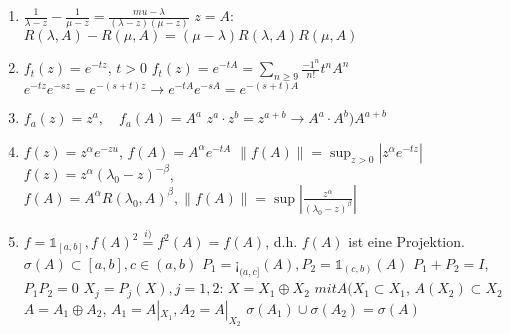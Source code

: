  \begin{beispiel}
 	\begin{enumerate}
 		\item $\frac{1}{\lambda - z} - \frac{1}{\mu - z} = \frac{mu - \lambda}{(\lambda - z)(\mu - z)}$
 			$z = A$: $R(\lambda, A) - R(\mu, A) = (\mu - \lambda) R(\lambda, A) R(\mu, A)$
 		\item $f_{t}(z) = e^{- tz}$, $t > 0$
 			$f_{t}(z) = e^{- t A} = \sum_{n \geq 9} \frac{{-1}^{n}}{n!} t^{n} A^{n}$
 			$e^{-t z} e^{- s z} = e^{- (s + t)z} \rightarrow e^{- tA}e^{ - sA} = e^{-(s + t)A}$
 		\item $f_{a}(z) = z^{a}, \quad f_{a}(A) = A^{a}$
 			$z^{a} \cdot z^{b} = z^{a + b} \rightarrow A^{a} \cdot A^{b} ) A^{a + b}$
 		\item $f(z) = z^{\alpha} e^{-z u}$, $f(A) = A^{\alpha} e^{- t A}$
 			$\| f(A) \| = \sup_{z > 0} | z^{\alpha} e^{- tz } |$
 			$f(z) = z^{\alpha}(\lambda_{0} - z )^{-\beta}$, $f(A) = A^{\alpha} R(\lambda_{0}, A)^{\beta}, \| f(A) \| = \sup \left| \frac{z^{\alpha} }{(\lambda_{0} - z)^{\beta}} \right|$
 		\item $f = \mathds{1}_{[a, b]}, f(A)^{2} \overset{i)}{=} f^{2}(A) = f(A)$, d.h. $f(A)$ ist eine Projektion.
 			$\sigma(A) \subset[a, b], c \in (a, b)$
 			$P_{1} = \mathds{¡}_{(a, c]}(A), P_{2} = \mathds{1}_{(c, b)}(A)$
 			$P_{1} + P_{2} = I$, $P_{1}P_{2} = 0$
 			$X_{j} = P_{j}(X), j = 1, 2$: $X = X_{1} \oplus X_{2}$
 			$mit A(X_{1} \subset X_{1}$, $A(X_{2}) \subset X_{2}$
 			$A = A_{1} \oplus A_{2}$, $A_{1} = A|_{X_{1}}, A_{2} = A|_{X_{2}}$
 			$\sigma(A_{1}) \cup \sigma(A_{2}) = \sigma(A)$
 	\end{enumerate}
 \end{beispiel}
 
